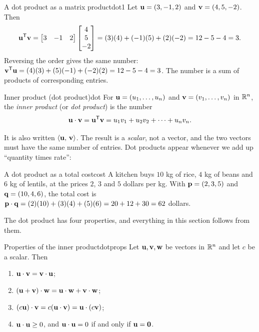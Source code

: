\documentclass[11pt]{article}
\begin{document}
\begin{exmp}{A dot product as a matrix product}{dot1}
Let $\mathbf{u}=(3,-1,2)$ and $\mathbf{v}=(4,5,-2)$. Then
\[
\mathbf{u}^{\mathsf T}\mathbf{v}=\begin{bmatrix}3&-1&2\end{bmatrix}\begin{bmatrix}4\\5\\-2\end{bmatrix}=(3)(4)+(-1)(5)+(2)(-2)=12-5-4=3.
\]
Reversing the order gives the same number: $\mathbf{v}^{\mathsf T}\mathbf{u}=(4)(3)+(5)(-1)+(-2)(2)=12-5-4=3$. The number is a sum of products of corresponding entries.
\end{exmp}

\begin{defn}{Inner product (dot product)}{dot}
For $\mathbf{u}=(u_1,\dots,u_n)$ and $\mathbf{v}=(v_1,\dots,v_n)$ in $\mathbb{R}^n$, the \emph{inner product} (or \emph{dot product}) is the number
\[
\mathbf{u}\cdot\mathbf{v}=\mathbf{u}^{\mathsf T}\mathbf{v}=u_1v_1+u_2v_2+\cdots+u_nv_n .
\]
\end{defn}

It is also written $\langle \mathbf{u},\,\mathbf{v}\rangle$. The result is a \emph{scalar}, not a vector, and the two vectors must have the same number of entries. Dot products appear whenever we add up ``quantity times rate'':

\begin{exmp}{A dot product as a total cost}{cost}
A kitchen buys $10$ kg of rice, $4$ kg of beans and $6$ kg of lentils, at the prices $2$, $3$ and $5$ dollars per kg. With $\mathbf{p}=(2,3,5)$ and $\mathbf{q}=(10,4,6)$, the total cost is $\mathbf{p}\cdot\mathbf{q}=(2)(10)+(3)(4)+(5)(6)=20+12+30=62$ dollars.
\end{exmp}

The dot product has four properties, and everything in this section follows from them.

\begin{thm}{Properties of the inner product}{dotprops}
Let $\mathbf{u},\mathbf{v},\mathbf{w}$ be vectors in $\mathbb{R}^n$ and let $c$ be a scalar. Then
\begin{enumerate}[label=(\alph*),itemsep=1pt]
  \item $\mathbf{u}\cdot\mathbf{v}=\mathbf{v}\cdot\mathbf{u}$;
  \item $(\mathbf{u}+\mathbf{v})\cdot\mathbf{w}=\mathbf{u}\cdot\mathbf{w}+\mathbf{v}\cdot\mathbf{w}$;
  \item $(c\mathbf{u})\cdot\mathbf{v}=c(\mathbf{u}\cdot\mathbf{v})=\mathbf{u}\cdot(c\mathbf{v})$;
  \item $\mathbf{u}\cdot\mathbf{u}\ge0$, and $\mathbf{u}\cdot\mathbf{u}=0$ if and only if $\mathbf{u}=\mathbf{0}$.
\end{enumerate}
\end{thm}
\end{document}
